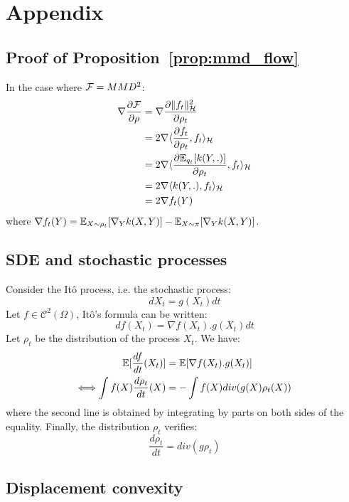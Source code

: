 
\section{Appendix}

\subsection{Proof of Proposition~\ref{prop:mmd_flow}}

In the case where ${{\mathcal F}}=MMD^2$:
\begin{align}
\nabla \frac{\partial {{\mathcal F}}}{\partial \rho}&= \nabla \frac{\partial \|f_t\|^2_{{{\mathcal H}}}}{\partial \rho_t}\\
&=2 \nabla \langle \frac{\partial f_t}{\partial \rho_t}, f_t \rangle_{{{\mathcal H}}}\\
&=2 \nabla \langle \frac{\partial {{\mathbb E}}_{q_t}[k(Y,.)]}{\partial \rho_t}, f_t \rangle_{{{\mathcal H}}}\\
&=2 \nabla \langle k(Y,.), f_t \rangle_{{{\mathcal H}}}\\
&= 2 \nabla f_t(Y)
\end{align}
where $\nabla f_t(Y)= {{\mathbb E}}_{X \sim \rho_t}[\nabla_{Y}k(X,Y)] -  {{\mathbb E}}_{X \sim \pi}[\nabla_{Y}k(X,Y)]$.

\subsection{SDE and stochastic processes}

Consider the Itô process, i.e. the stochastic process:
\begin{equation}
dX_t=g(X_t)dt
\end{equation}
Let $f \in \mathcal{C}^2(\Omega)$, Itô's formula can be written:
\begin{equation*}
df(X_t)=\nabla f(X_t).g(X_t)dt
\end{equation*}
Let $\rho_t$ be the distribution of the process $X_t$. We have:
\begin{align*}
{{\mathbb E}}[\frac{df}{dt}(X_t)]&= {{\mathbb E}}[\nabla f(X_t).g(X_t)]\\
\Longleftrightarrow \int f(X) \frac{d \rho_t}{dt}(X)&=-\int f(X)div(g(X)\rho_t(X))
\end{align*}
where the second line is obtained by integrating by parts on both sides of the equality. Finally, the distribution $\rho_t$ verifies: 
\begin{equation*}
\frac{d\rho_t}{dt}=div(g\rho_t)
\end{equation*}




\subsection{Displacement convexity}


